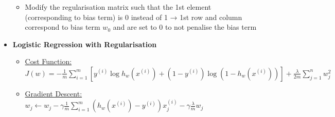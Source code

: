\documentclass[landscape]{article}
\begin{document}
\begin{multicols*}{5}
\begin{itemize}
          \begin{itemize}
            \item Modify the regularisation matrix such that the 1st element (corresponding to bias term) is 0 instead of 1 → 1st row and column correspond to bias term $w_0$ and are set to 0 to not penalise the bias term
          \end{itemize}
          \item \textbf{Logistic Regression with Regularisation}
          \begin{itemize}
            \item \underline{Cost Function:} $J(w) = -\frac{1}{m} \sum_{i=1}^{m} [ y^{(i)} \log h_w(x^{(i)}) +\left( 1 - y^{(i)} \right) \log \left( 1 - h_w(x^{(i)}) \right)] + \frac{\lambda}{2m} \sum_{j=1}^{n} w_j^2$
            \item \underline{Gradient Descent:} $w_j \leftarrow w_j - \gamma \frac{1}{m} \sum_{i=1}^{m} \left( h_w(x^{(i)}) - y^{(i)} \right) x_j^{(i)} - \gamma \frac{\lambda}{m} w_j$
          \end{itemize}
        \end{itemize}


\end{multicols*}
\end{document}
